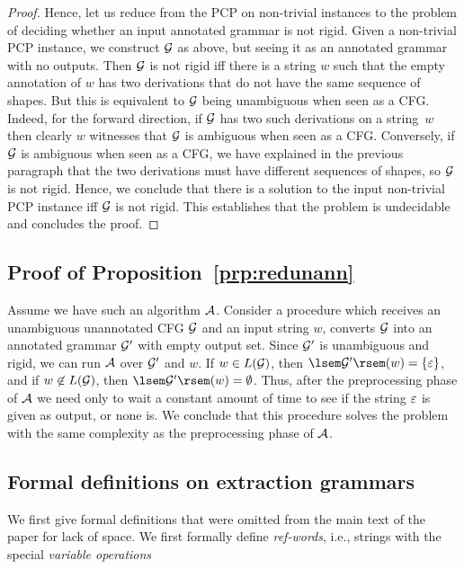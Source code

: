 \begin{proof}
  Hence, let us reduce from the PCP on non-trivial instances to the problem of
  deciding whether an input annotated grammar is not rigid. Given a
  non-trivial PCP instance, we construct $\mathcal{G}$ as above, but seeing it as an
  annotated grammar with no outputs. Then $\mathcal{G}$ is not rigid iff there is a
  string $w$ such that the empty annotation of $w$ has two derivations that do not
  have the same sequence of shapes. But this is equivalent to $\mathcal{G}$ being
  unambiguous when seen as a CFG. Indeed, for the forward direction, if $\mathcal{G}$ has
  two such derivations on a string~$w$ then clearly $w$ witnesses that $\mathcal{G}$ is
  ambiguous when seen as a CFG. Conversely, if $\mathcal{G}$ is ambiguous when seen as a
  CFG, we have explained in the previous paragraph that the two derivations must
  have different sequences of shapes, so $\mathcal{G}$ is not rigid. Hence, we
  conclude that there is a solution to the input non-trivial PCP instance iff
  $\mathcal{G}$ is not rigid. This establishes that the problem is undecidable
  and concludes the proof.
\end{proof}

\subsection{Proof of Proposition~\ref{prp:redunann}}

Assume we have such an algorithm $\mathcal{A}$. Consider a procedure which receives an unambiguous unannotated CFG $\mathcal{G}$ and an input string $w$, converts $\mathcal{G}$ into an annotated grammar $\mathcal{G}'$ with empty output set. Since $\mathcal{G}'$ is unambiguous and rigid, we can run $\mathcal{A}$ over $\mathcal{G}'$ and $w$. If $w\in L(\mathcal{G})$, then $\sem{\cG'}(w) = \{\eps\}$, and if $w\not\in L(\mathcal{G})$, then $\sem{\cG'}(w) = \emptyset$. Thus, after the preprocessing phase of $\mathcal{A}$ we need only to wait a constant amount of time to see if the string $\varepsilon$ is given as output, or none is. We conclude that this procedure solves the problem with the same complexity as the preprocessing phase of $\mathcal{A}$.

\subsection{Formal definitions on extraction grammars}
\label{apx:formalextraction}

We first give formal definitions that were omitted from the main text of the
paper for lack of space. We first formally define \emph{ref-words}, i.e.,
strings
with the special \emph{variable operations}


